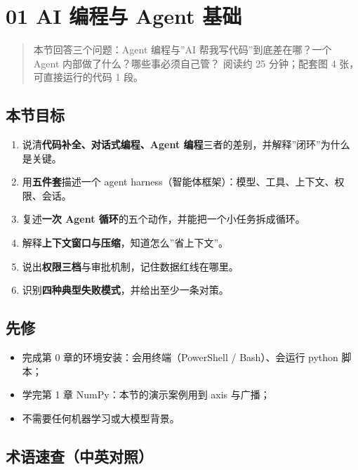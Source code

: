 \documentclass[
]{article}
\author{}
\date{}
\providecommand{\tightlist}{%
  \setlength{\itemsep}{0pt}\setlength{\parskip}{0pt}}
\begin{document}
\section{01 AI 编程与 Agent
基础}\label{ai-ux7f16ux7a0bux4e0e-agent-ux57faux7840}

\begin{quote}
本节回答三个问题：Agent 编程与''AI 帮我写代码''到底差在哪？一个 Agent
内部做了什么？哪些事必须自己管？ 阅读约 25 分钟；配套图 4
张，可直接运行的代码 1 段。
\end{quote}

\subsection{本节目标}\label{ux672cux8282ux76eeux6807}

\begin{enumerate}
\def\labelenumi{\arabic{enumi}.}
\tightlist
\item
  说清\textbf{代码补全、对话式编程、Agent
  编程}三者的差别，并解释''闭环''为什么是关键。
\item
  用\textbf{五件套}描述一个 agent
  harness（智能体框架）：模型、工具、上下文、权限、会话。
\item
  复述\textbf{一次 Agent 循环}的五个动作，并能把一个小任务拆成循环。
\item
  解释\textbf{上下文窗口与压缩}，知道怎么''省上下文''。
\item
  说出\textbf{权限三档}与审批机制，记住数据红线在哪里。
\item
  识别\textbf{四种典型失败模式}，并给出至少一条对策。
\end{enumerate}

\subsection{先修}\label{ux5148ux4fee}

\begin{itemize}
\tightlist
\item
  完成第 0 章的环境安装：会用终端（PowerShell / Bash）、会运行 python
  脚本；
\item
  学完第 1 章 NumPy：本节的演示案例用到 axis 与广播；
\item
  不需要任何机器学习或大模型背景。
\end{itemize}

\subsection{术语速查（中英对照）}\label{ux672fux8bedux901fux67e5ux4e2dux82f1ux5bf9ux7167}
\end{document}
